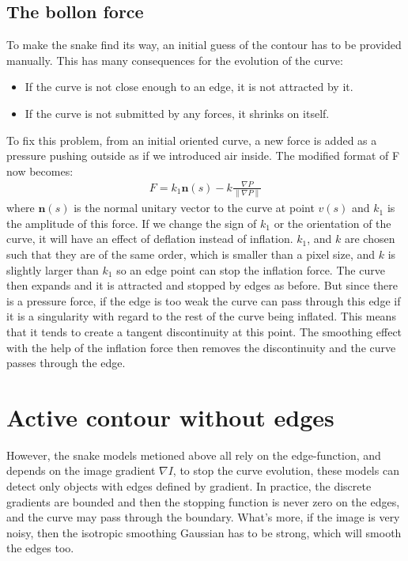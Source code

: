 \documentclass[journal]{IEEEtran}
\begin{document}
\subsection{The bollon force}
To make the snake find its way, an initial guess of the contour has to be provided manually. This has many consequences for the evolution of the curve:
\begin{itemize}
  \item If the curve is not close enough to an edge, it is not attracted by it.
  \item If the curve is not submitted by any forces, it shrinks on itself.
\end{itemize}
To fix this problem, from an initial oriented curve, a new force is added as a pressure pushing outside as if we introduced air inside. The modified format of F now becomes:
\begin{equation}\begin{aligned}
F=k_1\mathbf{n}(s)-k\frac{\nabla P}{\|\nabla P\|}
\end{aligned}\end{equation}
where $\mathbf{n}(s)$ is the normal unitary vector to the curve at point $v(s)$ and $k_1$ is the amplitude of this force. If we
change the sign of $k_1$ or the orientation of the curve, it will
have an effect of deflation instead of inflation. $k_1$, and $k$ are chosen such that they are of the same order, which is
smaller than a pixel size, and $k$ is slightly larger than $k_1$ so an edge point can stop the inflation force. The curve then
expands and it is attracted and stopped by edges as before. But since there is a pressure force, if the edge is too
weak the curve can pass through this edge if it is a singularity with regard to the rest of the curve being inflated.
This means that it tends to create a tangent discontinuity
at this point. The smoothing effect with the help of the
inflation force then removes the discontinuity and the
curve passes through the edge.

\section{Active contour without edges}
However, the snake models metioned above all rely on the edge-function, and depends on the image gradient $\nabla I$, to stop the curve evolution, these models can detect only objects with edges defined by gradient. In practice, the discrete gradients are bounded and then the stopping function is never zero on the edges, and the curve may pass through the boundary. What's more, if the image is very noisy, then  the isotropic smoothing Gaussian has to be strong, which will smooth the edges too.
\end{document}
